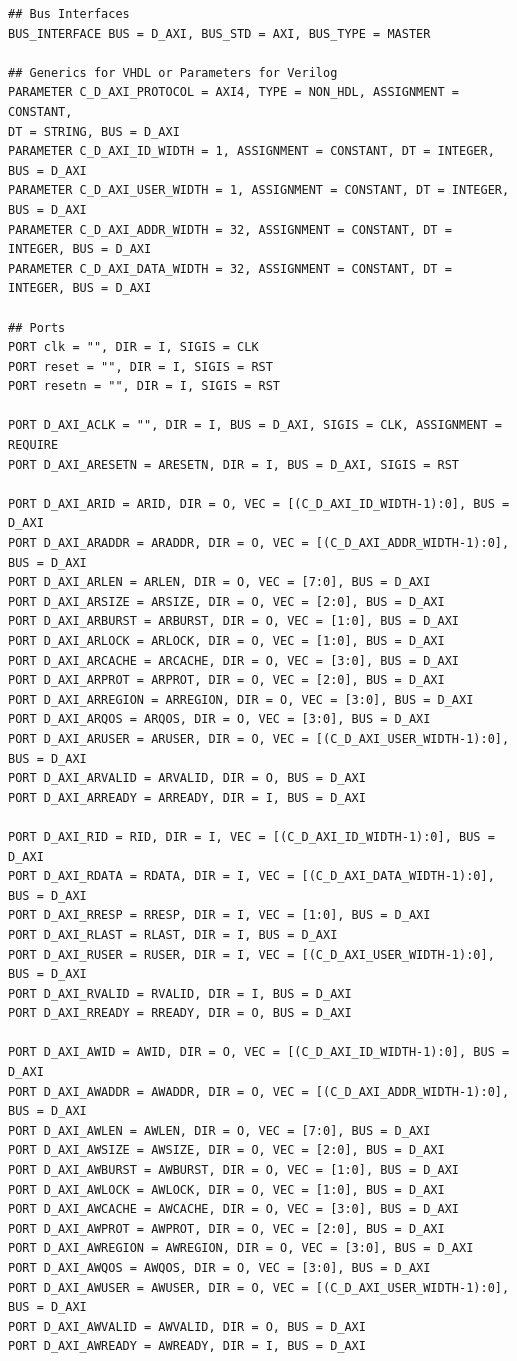 \documentclass[a4paper,10pt]{article}
\begin{document}
\begin{enumerate}
\begin{verbatim}
## Bus Interfaces
BUS_INTERFACE BUS = D_AXI, BUS_STD = AXI, BUS_TYPE = MASTER

## Generics for VHDL or Parameters for Verilog
PARAMETER C_D_AXI_PROTOCOL = AXI4, TYPE = NON_HDL, ASSIGNMENT = CONSTANT, 
DT = STRING, BUS = D_AXI
PARAMETER C_D_AXI_ID_WIDTH = 1, ASSIGNMENT = CONSTANT, DT = INTEGER, BUS = D_AXI
PARAMETER C_D_AXI_USER_WIDTH = 1, ASSIGNMENT = CONSTANT, DT = INTEGER, BUS = D_AXI
PARAMETER C_D_AXI_ADDR_WIDTH = 32, ASSIGNMENT = CONSTANT, DT = INTEGER, BUS = D_AXI
PARAMETER C_D_AXI_DATA_WIDTH = 32, ASSIGNMENT = CONSTANT, DT = INTEGER, BUS = D_AXI

## Ports
PORT clk = "", DIR = I, SIGIS = CLK
PORT reset = "", DIR = I, SIGIS = RST
PORT resetn = "", DIR = I, SIGIS = RST

PORT D_AXI_ACLK = "", DIR = I, BUS = D_AXI, SIGIS = CLK, ASSIGNMENT = REQUIRE
PORT D_AXI_ARESETN = ARESETN, DIR = I, BUS = D_AXI, SIGIS = RST

PORT D_AXI_ARID = ARID, DIR = O, VEC = [(C_D_AXI_ID_WIDTH-1):0], BUS = D_AXI
PORT D_AXI_ARADDR = ARADDR, DIR = O, VEC = [(C_D_AXI_ADDR_WIDTH-1):0], BUS = D_AXI
PORT D_AXI_ARLEN = ARLEN, DIR = O, VEC = [7:0], BUS = D_AXI
PORT D_AXI_ARSIZE = ARSIZE, DIR = O, VEC = [2:0], BUS = D_AXI
PORT D_AXI_ARBURST = ARBURST, DIR = O, VEC = [1:0], BUS = D_AXI
PORT D_AXI_ARLOCK = ARLOCK, DIR = O, VEC = [1:0], BUS = D_AXI
PORT D_AXI_ARCACHE = ARCACHE, DIR = O, VEC = [3:0], BUS = D_AXI
PORT D_AXI_ARPROT = ARPROT, DIR = O, VEC = [2:0], BUS = D_AXI
PORT D_AXI_ARREGION = ARREGION, DIR = O, VEC = [3:0], BUS = D_AXI
PORT D_AXI_ARQOS = ARQOS, DIR = O, VEC = [3:0], BUS = D_AXI
PORT D_AXI_ARUSER = ARUSER, DIR = O, VEC = [(C_D_AXI_USER_WIDTH-1):0], BUS = D_AXI
PORT D_AXI_ARVALID = ARVALID, DIR = O, BUS = D_AXI
PORT D_AXI_ARREADY = ARREADY, DIR = I, BUS = D_AXI

PORT D_AXI_RID = RID, DIR = I, VEC = [(C_D_AXI_ID_WIDTH-1):0], BUS = D_AXI
PORT D_AXI_RDATA = RDATA, DIR = I, VEC = [(C_D_AXI_DATA_WIDTH-1):0], BUS = D_AXI
PORT D_AXI_RRESP = RRESP, DIR = I, VEC = [1:0], BUS = D_AXI
PORT D_AXI_RLAST = RLAST, DIR = I, BUS = D_AXI
PORT D_AXI_RUSER = RUSER, DIR = I, VEC = [(C_D_AXI_USER_WIDTH-1):0], BUS = D_AXI
PORT D_AXI_RVALID = RVALID, DIR = I, BUS = D_AXI
PORT D_AXI_RREADY = RREADY, DIR = O, BUS = D_AXI

PORT D_AXI_AWID = AWID, DIR = O, VEC = [(C_D_AXI_ID_WIDTH-1):0], BUS = D_AXI
PORT D_AXI_AWADDR = AWADDR, DIR = O, VEC = [(C_D_AXI_ADDR_WIDTH-1):0], BUS = D_AXI
PORT D_AXI_AWLEN = AWLEN, DIR = O, VEC = [7:0], BUS = D_AXI
PORT D_AXI_AWSIZE = AWSIZE, DIR = O, VEC = [2:0], BUS = D_AXI
PORT D_AXI_AWBURST = AWBURST, DIR = O, VEC = [1:0], BUS = D_AXI
PORT D_AXI_AWLOCK = AWLOCK, DIR = O, VEC = [1:0], BUS = D_AXI
PORT D_AXI_AWCACHE = AWCACHE, DIR = O, VEC = [3:0], BUS = D_AXI
PORT D_AXI_AWPROT = AWPROT, DIR = O, VEC = [2:0], BUS = D_AXI
PORT D_AXI_AWREGION = AWREGION, DIR = O, VEC = [3:0], BUS = D_AXI
PORT D_AXI_AWQOS = AWQOS, DIR = O, VEC = [3:0], BUS = D_AXI
PORT D_AXI_AWUSER = AWUSER, DIR = O, VEC = [(C_D_AXI_USER_WIDTH-1):0], BUS = D_AXI
PORT D_AXI_AWVALID = AWVALID, DIR = O, BUS = D_AXI
PORT D_AXI_AWREADY = AWREADY, DIR = I, BUS = D_AXI


\end{verbatim}
\end{enumerate}
\end{document}
